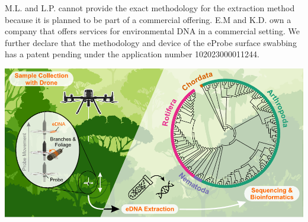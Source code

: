 \normalsize
%
M.L. and L.P. cannot provide the exact methodology for the extraction method because it is planned to be part of a commercial offering. E.M and K.D. own a company that offers services for environmental DNA in a commercial setting. We further declare that the methodology and device of the eProbe surface swabbing has a patent pending under the application number 102023000011244.
%
%
\footnotesize%

%
%
%
\begin{tocentry}
%
\includegraphics[width=\linewidth]{figures/00_graphical_abstract.pdf}
%
%
%
%
%
\end{tocentry}


